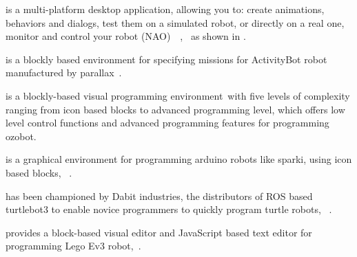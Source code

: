 \parhead{\choregraphe} is a multi-platform desktop application, allowing you to: create animations, behaviors and dialogs, test them on a simulated robot, or directly on a real one, monitor and control your robot (NAO)\, ~\cite{choregraphe,Monceaux2009}, %
\,\cite{Miskam2014} as shown in .

\parhead{\blocklyprop} is a blockly based environment for specifying missions for ActivityBot robot manufactured by parallax %
\,\cite{Parallax}.

\parhead{\ozoblockly} is a blockly-based visual programming environment\,\cite{ozobot} with five levels of complexity ranging from icon based blocks to advanced programming level, which offers low level control functions and advanced programming features for programming ozobot.%
 
\parhead{\minibloq} is a graphical environment for programming arduino robots like sparki, using icon based blocks, %
~\cite{miniBloq}. %
  
\parhead{\turtlebot} has been championed by Dabit industries, the distributors of ROS based turtlebot3 to enable novice programmers to quickly program turtle robots, %
~\cite{turtlebot3blockly}. %
 
\parhead{\makecode} provides a block-based visual editor and JavaScript based text editor for programming Lego Ev3 robot, %
\,\cite{makecode}.
 
